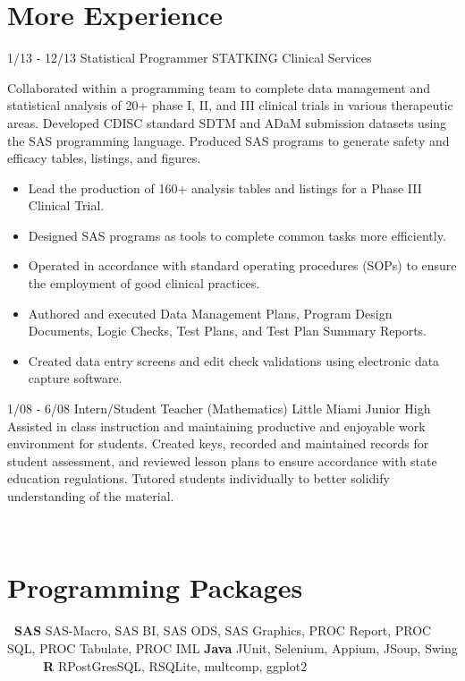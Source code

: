 \documentclass[]{./moak-resume}
\begin{document}
\section{More Experience}
\begin{entrylist}
    \entry
    {1/13 - 12/13}
    {Statistical Programmer}
    {STATKING Clinical Services}
    {Collaborated within a programming team to complete data management and statistical analysis of 20+ phase I, II, and III clinical trials in various therapeutic areas. Developed CDISC standard SDTM and ADaM submission datasets using the SAS programming language. Produced SAS programs to generate safety and efficacy tables, listings, and figures.
    	\begin{itemize}
    		\item Lead the production of 160+ analysis tables and listings for a Phase III Clinical Trial.
    		\item Designed SAS programs as tools to complete common tasks more efficiently.
    		\item Operated in accordance with standard operating procedures (SOPs) to ensure the employment of good clinical practices.
    		\item Authored and executed Data Management Plans, Program Design Documents, Logic Checks, Test Plans, and Test Plan Summary Reports.
    		\item Created data entry screens and edit check validations using electronic data capture software.
    	\end{itemize}}
    \entry
    {1/08 - 6/08}
    {Intern/Student Teacher (Mathematics)}
    {Little Miami Junior High}
    {Assisted in class instruction and maintaining productive and enjoyable work environment for students. Created keys, recorded and maintained records for student assessment, and reviewed lesson plans to ensure accordance with state education regulations. Tutored students individually to better solidify understanding of the material.}
\end{entrylist}
\\
 \section{Programming Packages}
 \begin{entrylist}
 	\entry
 	 {\textbf{ SAS}}
 	 {\textnormal{SAS-Macro, SAS BI, SAS ODS, SAS Graphics, PROC Report, PROC SQL, PROC Tabulate, PROC IML}}
 	 {}
 	 {}
 	\entry
 	 {\textbf{Java}}
 	 {\textnormal{JUnit, Selenium, Appium, JSoup, Swing}}
 	 {}
 	 {}
 	\entry
 	 {\textbf{     R}}
 	 {\textnormal{RPostGresSQL, RSQLite, multcomp, ggplot2}}
 	 {}
 	 {}
 \end{entrylist}
\\
\end{document}
